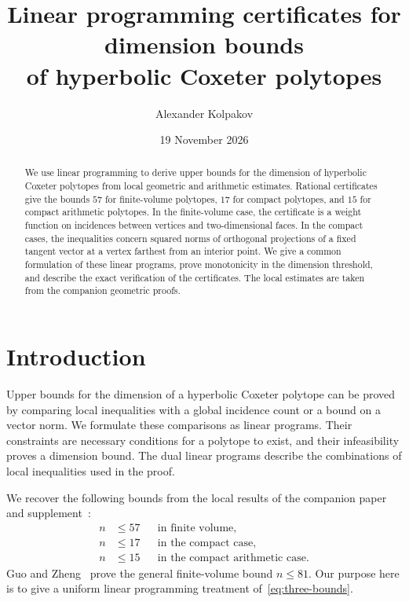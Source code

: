 \documentclass[11pt]{article}
\title{Linear programming certificates for dimension bounds\\
of hyperbolic Coxeter polytopes}
\author{Alexander Kolpakov}
\date{19 November 2026}
\theoremstyle{definition}
\theoremstyle{remark}
\numberwithin{equation}{section}
\begin{document}
\maketitle

\begin{abstract}
We use linear programming to derive upper bounds for the dimension of
hyperbolic Coxeter polytopes from local geometric and arithmetic
estimates. Rational certificates give the bounds $57$ for finite-volume
polytopes, $17$ for compact polytopes, and $15$ for compact arithmetic
polytopes. In the finite-volume case, the certificate is a weight
function on incidences between vertices and two-dimensional faces.
In the compact cases, the inequalities concern squared norms of
orthogonal projections of a fixed tangent vector at a vertex
farthest from an interior point.
We give a common formulation of these linear programs, prove
monotonicity in the dimension threshold, and describe the exact
verification of the certificates. The local estimates are taken from
the companion geometric proofs.
\end{abstract}

\tableofcontents

\section{Introduction}
\label{sec:introduction}

Upper bounds for the dimension of a hyperbolic Coxeter polytope can be
proved by comparing local inequalities with a global incidence count
or a bound on a vector norm. We formulate these comparisons as linear
programs. Their constraints are necessary conditions for a polytope
to exist, and their infeasibility proves a dimension bound. The dual
linear programs describe the combinations of local inequalities used
in the proof.

We recover the following bounds from the local results of the
companion paper and supplement~\cite{BoundsArticle,BoundsSupplement}:
\begin{equation}\label{eq:three-bounds}
 \begin{aligned}
 n&\le57&&\text{in finite volume},\\
 n&\le17&&\text{in the compact case},\\
 n&\le15&&\text{in the compact arithmetic case}.
 \end{aligned}
\end{equation}
Guo and Zheng~\cite{GuoZheng2026} prove the general finite-volume
bound $n\le81$. Our purpose here is to give a uniform linear
programming treatment of~\eqref{eq:three-bounds}.
\end{document}

